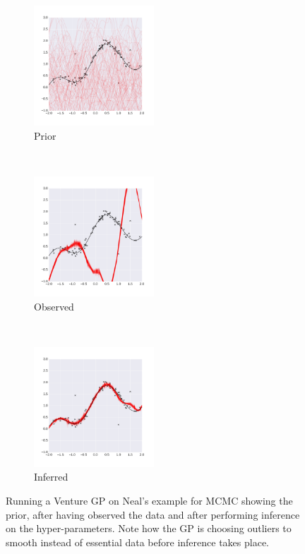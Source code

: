 \documentclass{article} %
\begin{document}
\begin{figure}
        \centering
        \begin{subfigure}[b]{0.3\textwidth} \centering
                \includegraphics[height=4.5cm]{figs/neal_se_1a.png}
                \caption{Prior}
                \label{fig:NealBO}
        \end{subfigure}%
        ~ %
        \begin{subfigure}[b]{0.3\textwidth} \centering
                \includegraphics[height=4.5cm]{figs/neal_se_2a.png}
                \caption{Observed}
                \label{fig:NealAO))}
        \end{subfigure}
        ~ %
        \begin{subfigure}[b]{0.3\textwidth} \centering
                \includegraphics[height=4.5cm]{figs/neal_se_3a.png}
                \caption{Inferred}
                \label{fig:NealAI}
        \end{subfigure}
        \caption{Running a Venture GP on Neal's example for MCMC showing the prior, after having observed the data and after performing inference on the hyper-parameters. Note how the GP is choosing outliers to smooth instead of essential data before inference takes place. }\label{fig:neal}
\end{figure}
\end{document}
